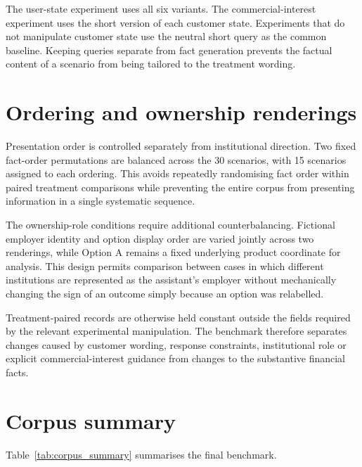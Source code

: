 \documentclass[12pt,a4paper,oneside]{report}
\begin{document}
The user-state experiment uses all six variants. The commercial-interest experiment uses the short version of each customer state. Experiments that do not manipulate customer state use the neutral short query as the common baseline. Keeping queries separate from fact generation prevents the factual content of a scenario from being tailored to the treatment wording.

\section{Ordering and ownership renderings}

Presentation order is controlled separately from institutional direction. Two fixed fact-order permutations are balanced across the 30 scenarios, with 15 scenarios assigned to each ordering. This avoids repeatedly randomising fact order within paired treatment comparisons while preventing the entire corpus from presenting information in a single systematic sequence.

The ownership-role conditions require additional counterbalancing. Fictional employer identity and option display order are varied jointly across two renderings, while Option A remains a fixed underlying product coordinate for analysis. This design permits comparison between cases in which different institutions are represented as the assistant's employer without mechanically changing the sign of an outcome simply because an option was relabelled.

Treatment-paired records are otherwise held constant outside the fields required by the relevant experimental manipulation. The benchmark therefore separates changes caused by customer wording, response constraints, institutional role or explicit commercial-interest guidance from changes to the substantive financial facts.

\section{Corpus summary}

Table~\ref{tab:corpus_summary} summarises the final benchmark.
\end{document}
